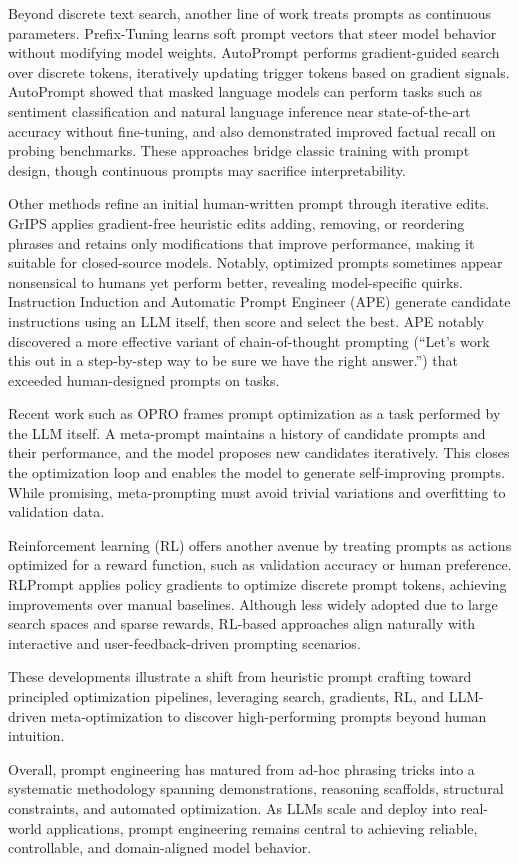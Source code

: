 Beyond discrete text search, another line of work treats prompts as continuous parameters. Prefix-Tuning \cite{li2021prefix} learns soft prompt vectors that steer model behavior without modifying model weights. AutoPrompt \cite{shin2020autoprompt} performs gradient-guided search over discrete tokens, iteratively updating trigger tokens based on gradient signals. AutoPrompt showed that masked language models can perform tasks such as sentiment classification and natural language inference near state-of-the-art accuracy without fine-tuning, and also demonstrated improved factual recall on probing benchmarks. These approaches bridge classic training with prompt design, though continuous prompts may sacrifice interpretability.

Other methods refine an initial human-written prompt through iterative edits. GrIPS \cite{prasad2023grips} applies gradient-free heuristic edits adding, removing, or reordering phrases and retains only modifications that improve performance, making it suitable for closed-source models. Notably, optimized prompts sometimes appear nonsensical to humans yet perform better, revealing model-specific quirks. Instruction Induction and Automatic Prompt Engineer (APE) \cite{zhou2022ape} generate candidate instructions using an LLM itself, then score and select the best. APE notably discovered a more effective variant of chain-of-thought prompting (``Let’s work this out in a step-by-step way to be sure we have the right answer.'') that exceeded human-designed prompts on tasks.

Recent work such as OPRO \cite{yao2023opro} frames prompt optimization as a task performed by the LLM itself. A meta-prompt maintains a history of candidate prompts and their performance, and the model proposes new candidates iteratively. This closes the optimization loop and enables the model to generate self-improving prompts. While promising, meta-prompting must avoid trivial variations and overfitting to validation data.

Reinforcement learning (RL) offers another avenue by treating prompts as actions optimized for a reward function, such as validation accuracy or human preference. RLPrompt \cite{deng2022rlprompt} applies policy gradients to optimize discrete prompt tokens, achieving improvements over manual baselines. Although less widely adopted due to large search spaces and sparse rewards, RL-based approaches align naturally with interactive and user-feedback-driven prompting scenarios.

These developments illustrate a shift from heuristic prompt crafting toward principled optimization pipelines, leveraging search, gradients, RL, and LLM-driven meta-optimization to discover high-performing prompts beyond human intuition.

Overall, prompt engineering has matured from ad-hoc phrasing tricks into a systematic methodology spanning demonstrations, reasoning scaffolds, structural constraints, and automated optimization. As LLMs scale and deploy into real-world applications, prompt engineering remains central to achieving reliable, controllable, and domain-aligned model behavior.

\newpage
